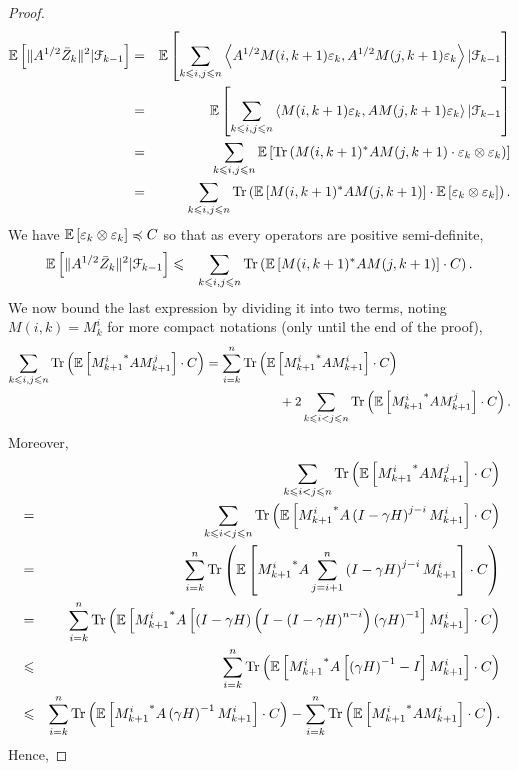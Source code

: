\begin{proof}
\begin{eqnarray*}
{\mathbb E} \left[ \|A^{1/2} \bar{Z}_k\|^2 | \mathcal{F}_{k-1} \right] & =& {\mathbb E} \left[ \sum_{k\leqslant i, j \leqslant n} \left\langle A^{1/2} M(i,k+1)\varepsilon_k, A^{1/2} M(j,k+1)\varepsilon_k\right\rangle | \mathcal{F}_{k-1} \right] \\
& =& {\mathbb E} \left[ \sum_{k\leqslant i, j \leqslant n} \left\langle M(i,k+1)\varepsilon_k, A M(j,k+1)\varepsilon_k\right\rangle | \mathcal{F}_{k-1} \right] \\
& =& \sum_{k\leqslant i, j \leqslant n} {\mathbb E} \left[ \operatorname{Tr} \left( M(i,k+1)^* A M(j,k+1) \cdot \varepsilon_k\otimes \varepsilon_k\right) \right] \\
& =& \sum_{k\leqslant i, j \leqslant n} \operatorname{Tr}\left( {\mathbb E} \left[  M(i,k+1)^* A M(j,k+1)\right] \cdot {\mathbb E} \left[ \varepsilon_k\otimes \varepsilon_k \right]\right).
\end{eqnarray*}
We have ${\mathbb E} \left[ \varepsilon_k\otimes \varepsilon_k \right] \preccurlyeq C $ so that as every operators are positive semi-definite, 
\begin{eqnarray*}
{\mathbb E} \left[ \|A^{1/2} \bar{Z}_k\|^2 | \mathcal{F}_{k-1} \right] & \leqslant & \sum_{k\leqslant i, j \leqslant n} \operatorname{Tr}\left( {\mathbb E} \left[  M(i,k+1)^* A M(j,k+1)\right] \cdot C\right).
\end{eqnarray*}
We now bound the last expression by dividing it into two terms, noting $M(i,k) = M^i_k$ for more compact notations (only until the end of the proof),
\begin{align*}
\sum_{k\leqslant i, j \leqslant n} \operatorname{Tr}\left( {\mathbb E} \left[  {M^i_{k+1}}^* A M^j_{k+1}\right] \cdot C\right) & = \sum_{i=k}^n \operatorname{Tr}\left( {\mathbb E} \left[  {M^i_{k+1}}^* A M^i_{k+1}\right] \cdot C\right) \\
& \hspace{2cm}+ 2 \sum_{k\leqslant i < j \leqslant n} \operatorname{Tr}\left( {\mathbb E} \left[  {M^i_{k+1}}^* A M^j_{k+1}\right] \cdot C\right).
\end{align*}
Moreover, 
\begin{eqnarray*}
 & &  \sum_{k\leqslant i < j \leqslant n} \operatorname{Tr}\left( {\mathbb E} \left[  {M^i_{k+1}}^* A M^j_{k+1}\right] \cdot C\right) 
 \\ & = &  \sum_{k\leqslant i < j \leqslant n} \operatorname{Tr}\left( {\mathbb E} \left[  {M^i_{k+1}}^* A \left( I - \gamma H \right)^{j-i} M^i_{k+1}\right] \cdot C\right) \\
& = &  \sum_{i=k}^n \operatorname{Tr}\left( {\mathbb E} \left[  {M^i_{k+1}}^* A \sum_{j=i+1}^n \left( I - \gamma H \right)^{j-i} M^i_{k+1}\right] \cdot C\right) \\
& = &  \sum_{i=k}^n \operatorname{Tr}\left( {\mathbb E} \left[  {M^i_{k+1}}^* A \left[ \left( I - \gamma H \right) \left( I - \left( I - \gamma H \right)^{n-i} \right) \left(\gamma H \right)^{-1} \right] M^i_{k+1}\right] \cdot C \right) \\
& \leqslant  &  \sum_{i=k}^n \operatorname{Tr}\left( {\mathbb E} \left[  {M^i_{k+1}}^* A \left[ \left(\gamma H\right)^{-1} - I \right] M^i_{k+1}\right] \cdot C \right)\\
& \leqslant  &  \sum_{i=k}^n \operatorname{Tr}\left( {\mathbb E} \left[  {M^i_{k+1}}^* A \left(\gamma H\right)^{-1} M^i_{k+1}\right] \cdot C \right)-\sum_{i=k}^n \operatorname{Tr}\left( {\mathbb E} \left[  {M^i_{k+1}}^* A M^i_{k+1}\right] \cdot C \right).
\end{eqnarray*}
Hence, 


\end{proof}

